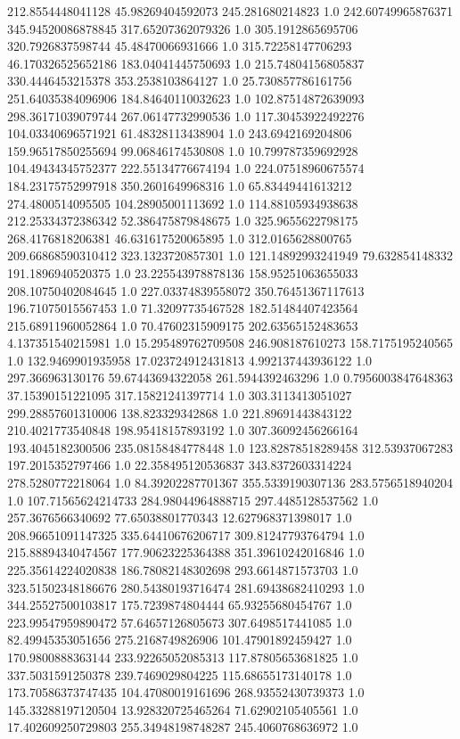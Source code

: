 212.8554448041128	45.98269404592073	245.281680214823	1.0
242.60749965876371	345.94520086878845	317.65207362079326	1.0
305.1912865695706	320.7926837598744	45.48470066931666	1.0
315.72258147706293	46.170326525652186	183.04041445750693	1.0
215.74804156805837	330.4446453215378	353.2538103864127	1.0
25.730857786161756	251.64035384096906	184.84640110032623	1.0
102.87514872639093	298.36171039079744	267.06147732990536	1.0
117.30453922492276	104.03340696571921	61.48328113438904	1.0
243.6942169204806	159.96517850255694	99.06846174530808	1.0
10.799787359692928	104.49434345752377	222.55134776674194	1.0
224.07518960675574	184.23175752997918	350.2601649968316	1.0
65.83449441613212	274.4800514095505	104.28905001113692	1.0
114.88105934938638	212.25334372386342	52.386475879848675	1.0
325.9655622798175	268.4176818206381	46.631617520065895	1.0
312.0165628800765	209.66868590310412	323.1323720857301	1.0
121.14892993241949	79.632854148332	191.1896940520375	1.0
23.225543978878136	158.95251063655033	208.10750402084645	1.0
227.03374839558072	350.76451367117613	196.71075015567453	1.0
71.32097735467528	182.51484407423564	215.68911960052864	1.0
70.47602315909175	202.63565152483653	4.137351540215981	1.0
15.295489762709508	246.908187610273	158.7175195240565	1.0
132.9469901935958	17.023724912431813	4.992137443936122	1.0
297.366963130176	59.67443694322058	261.5944392463296	1.0
0.7956003847648363	37.15390151221095	317.15821241397714	1.0
303.3113413051027	299.28857601310006	138.823329342868	1.0
221.89691443843122	210.4021773540848	198.95418157893192	1.0
307.36092456266164	193.4045182300506	235.08158484778448	1.0
123.82878518289458	312.53937067283	197.2015352797466	1.0
22.358495120536837	343.8372603314224	278.5280772218064	1.0
84.39202287701367	355.5339190307136	283.5756518940204	1.0
107.71565624214733	284.98044964888715	297.4485128537562	1.0
257.3676566340692	77.65038801770343	12.627968371398017	1.0
208.96651091147325	335.64410676206717	309.81247793764794	1.0
215.88894340474567	177.90623225364388	351.39610242016846	1.0
225.35614224020838	186.78082148302698	293.6614871573703	1.0
323.51502348186676	280.54380193716474	281.69438682410293	1.0
344.25527500103817	175.7239874804444	65.93255680454767	1.0
223.99547959890472	57.64657126805673	307.6498517441085	1.0
82.49945353051656	275.2168749826906	101.47901892459427	1.0
170.9800888363144	233.92265052085313	117.87805653681825	1.0
337.5031591250378	239.7469029804225	115.68655173140178	1.0
173.70586373747435	104.47080019161696	268.93552430739373	1.0
145.33288197120504	13.928320725465264	71.62902105405561	1.0
17.402609250729803	255.34948198748287	245.4060768636972	1.0
